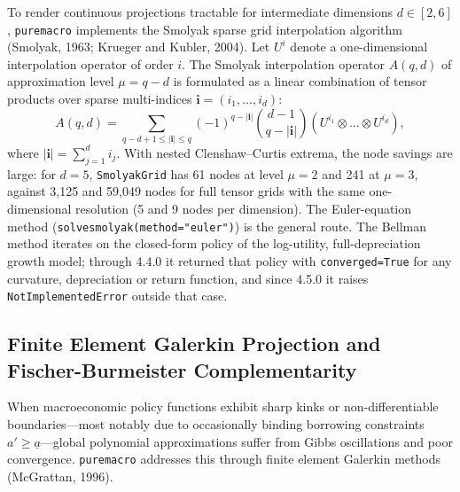 \documentclass[11pt,letterpaper]{article}
\renewcommand{\_}{\pmunderscore\allowbreak}
\begin{document}
To render continuous projections tractable for intermediate dimensions \(d \in [2, 6]\), \texttt{puremacro} implements the Smolyak sparse grid interpolation algorithm (Smolyak, 1963; Krueger and Kubler, 2004). Let \(U^i\) denote a one-dimensional interpolation operator of order \(i\). The Smolyak interpolation operator \(A(q, d)\) of approximation level \(\mu = q - d\) is formulated as a linear combination of tensor products over sparse multi-indices \(\mathbf{i} = (i_1, \dots, i_d)\):
\[A(q, d) = \sum_{q - d + 1 \le |\mathbf{i}| \le q} (-1)^{q - |\mathbf{i}|} \binom{d - 1}{q - |\mathbf{i}|} \left( U^{i_1} \otimes \dots \otimes U^{i_d} \right),\]
where \(|\mathbf{i}| = \sum_{j=1}^d i_j\). With nested Clenshaw--Curtis extrema, the node savings are large: for \(d = 5\), \texttt{SmolyakGrid} has 61 nodes at level \(\mu = 2\) and 241 at \(\mu = 3\), against 3,125 and 59,049 nodes for full tensor grids with the same one-dimensional resolution (5 and 9 nodes per dimension). The Euler-equation method (\texttt{solve\_smolyak(method="euler")}) is the general route. The Bellman method iterates on the closed-form policy of the log-utility, full-depreciation growth model; through 4.4.0 it returned that policy with \texttt{converged=True} for any curvature, depreciation or return function, and since 4.5.0 it raises \texttt{NotImplementedError} outside that case.

\subsection{Finite Element Galerkin Projection and Fischer-Burmeister Complementarity}\label{finite-element-galerkin-projection-and-fischer-burmeister-complementarity}

When macroeconomic policy functions exhibit sharp kinks or non-differentiable boundaries---most notably due to occasionally binding borrowing constraints \(a' \ge \underline{a}\)---global polynomial approximations suffer from Gibbs oscillations and poor convergence. \texttt{puremacro} addresses this through finite element Galerkin methods (McGrattan, 1996).
\end{document}
